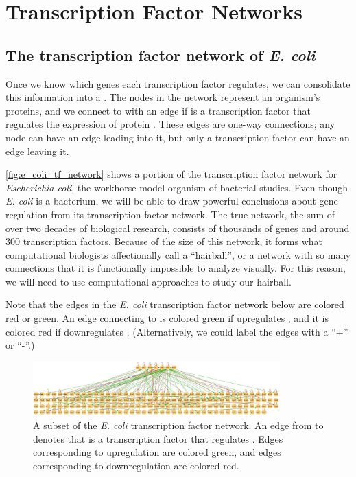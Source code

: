\FloatBarrier
{}

\section{Transcription Factor Networks}
\label{sec:transcription_factor_networks}

\subsection{The transcription factor network of \textit{E. coli}}

Once we know which genes each transcription factor regulates, we can consolidate this information into a . The nodes in the network represent an organism's proteins, and we connect  to  with an edge if  is a transcription factor that regulates the expression of protein . These edges are one-way connections; any node can have an edge leading into it, but only a transcription factor can have an edge leaving it.

\autoref{fig:e_coli_tf_network} shows a portion of the transcription factor network for \textit{Escherichia coli}, the workhorse model organism of bacterial studies. Even though \textit{E. coli} is a bacterium, we will be able to draw powerful conclusions about gene regulation from its transcription factor network. The true network, the sum of over two decades of biological research, consists of thousands of genes and around 300 transcription factors. Because of the size of this network, it forms what computational biologists affectionally call a ``hairball'', or a network with so many connections that it is functionally impossible to analyze visually. For this reason, we will need to use computational approaches to study our hairball.

Note that the edges in the \textit{E. coli} transcription factor network below are colored red or green. An edge connecting  to  is colored green if  upregulates , and it is colored red if  downregulates . (Alternatively, we could label the edges with a ``+'' or ``-''.)\\

\begin{figure}[h]
\centering
\mySfFamily
\includegraphics[width = 0.85\textwidth]{../images/e_coli_tf_network.jpeg}
\caption{A subset of the \textit{E. coli} transcription factor network. An edge from  to  denotes that  is a transcription factor that regulates . Edges corresponding to upregulation are colored green, and edges corresponding to downregulation are colored red.}
\label{fig:e_coli_tf_network}
\end{figure}

